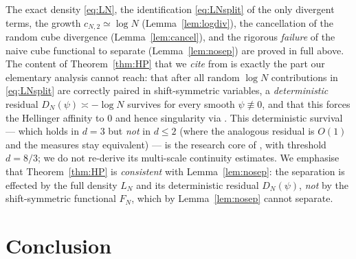 \begin{remark}
The exact density \eqref{eq:LN}, the identification \eqref{eq:LNsplit} of the only
divergent terms, the growth $c_{N,2}\simeq\log N$ (Lemma~\ref{lem:logdiv}), the
cancellation of the random cube divergence (Lemma~\ref{lem:cancel}), and the rigorous
\emph{failure} of the naive cube functional to separate (Lemma~\ref{lem:nosep}) are
proved in full above. The content of Theorem~\ref{thm:HP} that we \emph{cite} from
\cite{HP25,HKN24} is exactly the part our elementary analysis cannot reach: that after
all random $\log N$ contributions in \eqref{eq:LNsplit} are correctly paired in
shift-symmetric variables, a \emph{deterministic} residual $D_N(\psi)\asymp-\log N$
survives for every smooth $\psi\not\equiv0$, and that this forces the Hellinger
affinity to $0$ and hence singularity via \cite{HKN24}. This deterministic survival ---
which holds in $d=3$ but \emph{not} in $d\le2$ (where the analogous residual is
$O(1)$ and the measures stay equivalent) --- is the research core of \cite{HP25}, with
threshold $d=8/3$; we do not re-derive its multi-scale continuity estimates. We
emphasise that Theorem~\ref{thm:HP} is \emph{consistent} with Lemma~\ref{lem:nosep}: the
separation is effected by the full density $L_N$ and its deterministic residual
$D_N(\psi)$, \emph{not} by the shift-symmetric functional $F_N$, which by
Lemma~\ref{lem:nosep} cannot separate.
\end{remark}

\section*{Conclusion}

